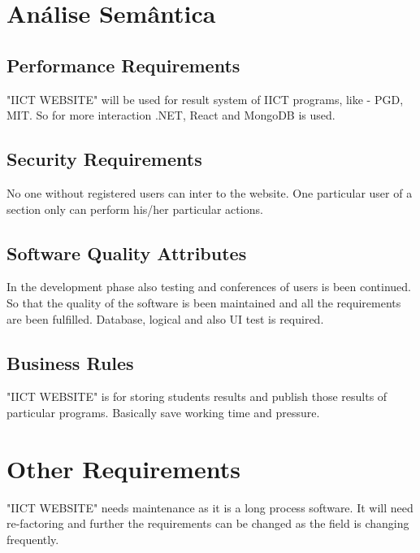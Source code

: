 \documentclass{scrreprt}
\begin{document}
\chapter{Análise Semântica}

\section{Performance Requirements}
"IICT WEBSITE" will be used for result system of IICT programs, like - PGD, MIT. So for more interaction .NET, React and MongoDB is used. 

\section{Security Requirements}
No one without registered users can inter to the website. One particular user of a section only can perform his/her particular actions. 

\section{Software Quality Attributes}
In the development phase also testing and conferences of users is been continued. So that the quality of the software is been maintained and all the requirements are been fulfilled.
\newline
Database, logical and also UI test is required. 

\section{Business Rules}
"IICT WEBSITE" is for storing students results and publish those results of particular programs.
\newline
Basically save working time and pressure. 


\chapter{Other Requirements}
"IICT WEBSITE" needs maintenance as it is a long process software. It will need re-factoring and further the requirements can be changed as the field is changing frequently. 
\end{document}

